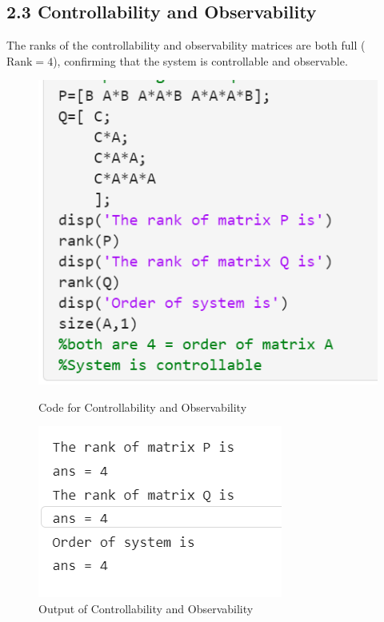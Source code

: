 \documentclass[a4paper,12pt]{article}
\begin{document}
\subsection*{2.3 Controllability and Observability}
The ranks of the controllability and observability matrices are both full (\( \text{Rank} = 4\)), confirming that the system is controllable and observable.
\begin{figure}[h!]
    \centering
    \begin{minipage}{0.45\textwidth}
        \centering
        \includegraphics[width=\textwidth]{rank.png}
        \caption{Code for Controllability and Observability}
    
    \end{minipage}
    \hfill
    \begin{minipage}{0.45\textwidth}
        \centering
        \includegraphics[width=\textwidth]{rank_output.png}
        \caption{Output of Controllability and Observability}
        
    \end{minipage}
\end{figure}
\end{document}

